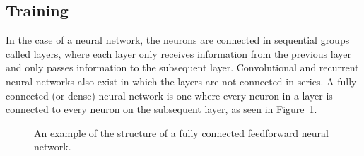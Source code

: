 \subsection{Training} \label{sec:backpropagation}

In the case of a  neural network, the neurons are connected in sequential groups called layers, where each layer only receives information from the previous layer and only passes information to the subsequent layer.
Convolutional and recurrent neural networks also exist in which the layers are not connected in series.
A fully connected (or dense) neural network is one where every neuron in a layer is connected to every neuron on the subsequent layer, as seen in Figure~\ref{fig:neural-network-example}.

\begin{figure}[htbp]
	\centering
	
	\caption{An example of the structure of a fully connected feedforward neural network.}
	\label{fig:neural-network-example}
\end{figure}

